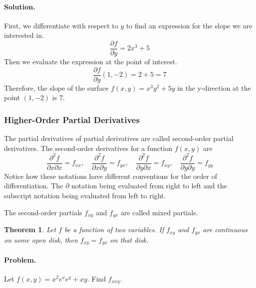 \documentclass[oneside]{book}
\newtheorem{theorem}{Theorem}
\begin{document}
\paragraph{Solution.}
First, we differentiate with respect to \(y\) to find an expression for the slope we are interested in.
\[\frac{\partial f}{\partial y} = 2x^{3} + 5\]
Then we evaluate the expression at the point of interest.
\[\frac{\partial f}{\partial y}\left(1, -2\right) = 2 + 5 = 7\]
Therefore, the slope of the surface \(f(x, y) = x^{3}y^{2} + 5y\) in the y-direction at the point \((1, -2)\) is 7.

\subsubsection{Higher-Order Partial Derivatives}
The partial derivatives of partial derivatives are called second-order partial
derivatives. The second-order derivatives for a function \(f\left(x, y\right)\)
are
\[\frac{\partial^2 f}{\partial x \partial x} = f_{xx},
\quad \frac{\partial^2 f}{\partial x \partial y} = f_{yx},
\quad \frac{\partial^2 f}{\partial y \partial x} = f_{xy},
\quad \frac{\partial^2 f}{\partial y \partial y} = f_{yy}\]
Notice how these notations have different conventions for the order of
differentiation. The \(\partial\) notation being evaluated from right to left
and the subscript notation being evaluated from left to right.

The second-order partials \(f_{xy}\) and \(f_{yx}\) are called mixed partials.

\begin{theorem}
    Let \(f\) be a function of two variables. If \(f_{xy}\) and \(f_{yx}\) are
    continuous on some open disk, then \(f_{xy} = f_{yx}\) on that disk.
\end{theorem}

\paragraph{Problem.} Let \(f\left(x, y\right) = x^2 e^x e^y + xy\). Find \(f_{xxy}\).
\end{document}
